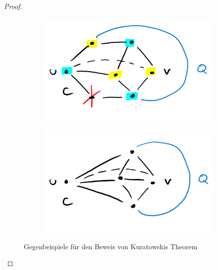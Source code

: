 \begin{proof}
\begin{figure}
\begin{subfigure}[c]{\w}
            \label{fig:kuratowski-bsp2}
        \end{subfigure}
        \begin{subfigure}[c]{\w}
            \centering
            \includegraphics[width=\textwidth]{figures/kuratowski3.png}
            \label{fig:kuratowski-bsp3}
        \end{subfigure}
        \begin{subfigure}[c]{\w}
            \centering
            \includegraphics[width=\textwidth]{figures/kuratowski4.png}
            \label{fig:kuratowski-bsp4}
        \end{subfigure}
        \caption{Gegenbeispiele für den Beweis von Kuratowskis Theorem}
        \label{fig:kuratowski-bsp}
    \end{figure}
\end{proof}
